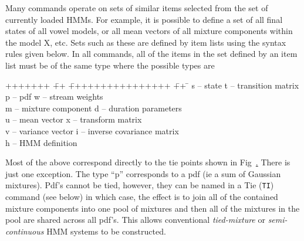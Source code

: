 Many  commands operate on sets of similar items selected from the
set of currently loaded HMMs.  For example, it is possible to define a set of
all final states of all vowel models, or all mean vectors of all mixture
components within the model X, etc.  Sets such as these are defined by item
lists using the syntax rules given below.  In all commands, all of the items in
the set defined by an item list must be of the same type where the possible
types are
\begin{tabbing}
+++++++ \= ++ \=  ++++++++++++++++ \= ++ \= \kill
\>  s \> -- state             \> t \> -- transition matrix \\
\>  p \> -- pdf               \> w \> -- stream weights \\
\>  m \> -- mixture component \> d \> -- duration parameters \\
\>  u \> -- mean vector       \> x \> -- transform matrix \\
\>  v \> -- variance vector   \> i \> -- inverse covariance matrix \\
\>  h \> -- HMM definition
\end{tabbing}
\noindent
Most of the above correspond directly to the tie points shown in
Fig~\href{f:hierarch}.  There is just one exception.  The type ``p''
corresponds to a pdf (ie a sum of Gaussian mixtures).  Pdf's cannot
be tied, however, they can be named in a Tie (\texttt{TI}) command
(see below) in which case, the effect is to join all of the contained
mixture components into one pool of mixtures and then all of the
mixtures in the pool are shared across all pdf's.  This allows
conventional {\it tied-mixture} or {\it semi-continuous} HMM systems
to be constructed.

